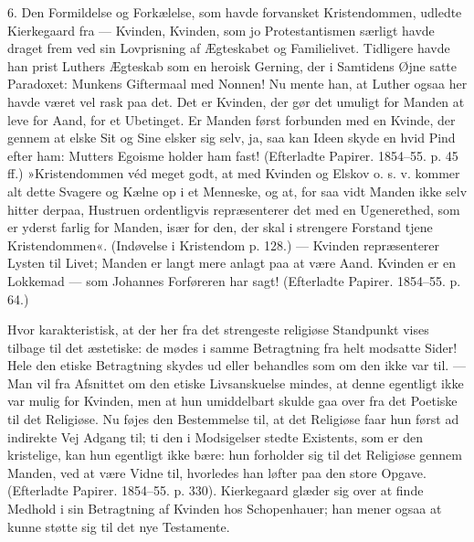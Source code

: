 \documentclass[12pt,a4paper,openany]{book}
\newcommand{\opage}[1]{\marginnote{\footnotesize\textit{[#1]}}}
\begin{document}
6. Den Formildelse og Forkælelse, som havde forvansket
Kristendommen, udledte Kierkegaard fra --- Kvinden,
Kvinden, som jo Protestantismen særligt havde
draget frem ved sin Lovprisning af Ægteskabet og Familielivet.
Tidligere havde han prist Luthers Ægteskab
som en heroisk Gerning, der i Samtidens Øjne satte
Paradoxet: Munkens Giftermaal med Nonnen! Nu mente
han, at Luther ogsaa her havde været vel rask paa det.
Det er Kvinden, der gør det umuligt for Manden at leve
\opage{141}for Aand, for et Ubetinget. Er Manden først forbunden
med en Kvinde, der gennem at elske Sit og Sine elsker
sig selv, ja, saa kan Ideen skyde en hvid Pind efter
ham: Mutters Egoisme holder ham fast! (Efterladte Papirer.
1854--55. p. 45 ff.) »Kristendommen véd meget
godt, at med Kvinden og Elskov o. s. v. kommer alt dette
Svagere og Kælne op i et Menneske, og at, for saa vidt
Manden ikke selv hitter derpaa, Hustruen ordentligvis
repræsenterer det med en Ugenerethed, som er yderst farlig
for Manden, især for den, der skal i strengere Forstand
tjene Kristendommen«. (Indøvelse i Kristendom p. 128.) ---
Kvinden repræsenterer Lysten til Livet; Manden er langt
mere anlagt paa at være Aand. Kvinden er en Lokkemad
--- som Johannes Forføreren har sagt! (Efterladte
Papirer. 1854--55. p. 64.)

Hvor karakteristisk, at der her fra det strengeste religiøse
Standpunkt vises tilbage til det æstetiske: de mødes
i samme Betragtning fra helt modsatte Sider! Hele den
etiske Betragtning skydes ud eller behandles som om den
ikke var til. --- Man vil fra Afsnittet om den etiske Livsanskuelse
mindes, at denne egentligt ikke var mulig for
Kvinden, men at hun umiddelbart skulde gaa over fra
det Poetiske til det Religiøse. Nu føjes den Bestemmelse
til, at det Religiøse faar hun først ad indirekte Vej
Adgang til; ti den i Modsigelser stedte Existents, som er
den kristelige, kan hun egentligt ikke bære: hun forholder
sig til det Religiøse gennem Manden, ved at være
Vidne til, hvorledes han løfter paa den store Opgave.
(Efterladte Papirer. 1854--55. p. 330). Kierkegaard glæder
sig over at finde Medhold i sin Betragtning af Kvinden
hos Schopenhauer; han mener ogsaa at kunne støtte sig
til det nye Testamente.
\end{document}
